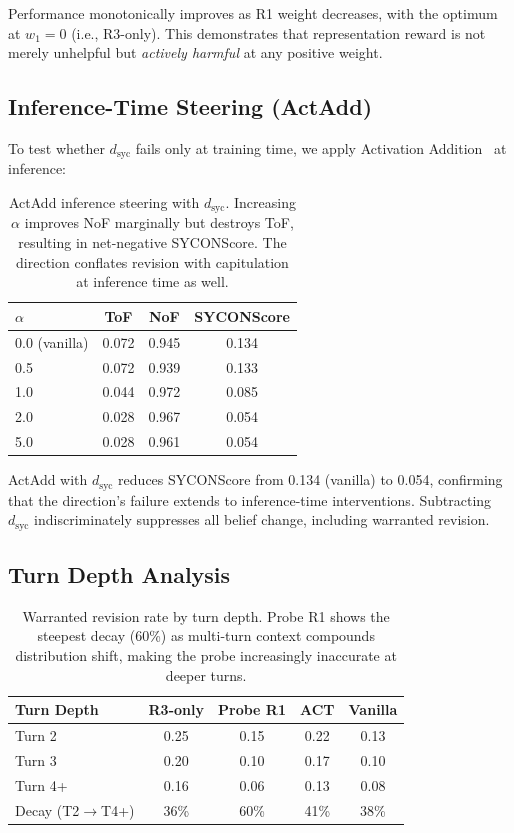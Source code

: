 \documentclass[11pt,a4paper]{article}
\begin{document}
Performance monotonically improves as R1 weight decreases, with the optimum at $w_1=0$ (i.e., R3-only). This demonstrates that representation reward is not merely unhelpful but \emph{actively harmful} at any positive weight.

\subsection{Inference-Time Steering (ActAdd)}

To test whether $d_\text{syc}$ fails only at training time, we apply Activation Addition~\cite{turner2023activation} at inference:

\begin{table}[h]
\centering
\small
\begin{tabular}{lccc}
\toprule
\textbf{$\alpha$} & \textbf{ToF} & \textbf{NoF} & \textbf{SYCONScore} \\
\midrule
0.0 (vanilla) & 0.072 & 0.945 & 0.134 \\
0.5 & 0.072 & 0.939 & 0.133 \\
1.0 & 0.044 & 0.972 & 0.085 \\
2.0 & 0.028 & 0.967 & 0.054 \\
5.0 & 0.028 & 0.961 & 0.054 \\
\bottomrule
\end{tabular}
\caption{ActAdd inference steering with $d_\text{syc}$. Increasing $\alpha$ improves NoF marginally but destroys ToF, resulting in net-negative SYCONScore. The direction conflates revision with capitulation at inference time as well.}
\label{tab:actadd}
\end{table}

ActAdd with $d_\text{syc}$ reduces SYCONScore from 0.134 (vanilla) to 0.054, confirming that the direction's failure extends to inference-time interventions. Subtracting $d_\text{syc}$ indiscriminately suppresses all belief change, including warranted revision.

\subsection{Turn Depth Analysis}

\begin{table}[h]
\centering
\small
\begin{tabular}{lcccc}
\toprule
\textbf{Turn Depth} & \textbf{R3-only} & \textbf{Probe R1} & \textbf{ACT} & \textbf{Vanilla} \\
\midrule
Turn 2 & 0.25 & 0.15 & 0.22 & 0.13 \\
Turn 3 & 0.20 & 0.10 & 0.17 & 0.10 \\
Turn 4+ & 0.16 & 0.06 & 0.13 & 0.08 \\
\midrule
Decay (T2$\to$T4+) & 36\% & 60\% & 41\% & 38\% \\
\bottomrule
\end{tabular}
\caption{Warranted revision rate by turn depth. Probe R1 shows the steepest decay (60\%) as multi-turn context compounds distribution shift, making the probe increasingly inaccurate at deeper turns.}
\label{tab:turn_depth}
\end{table}
\end{document}
